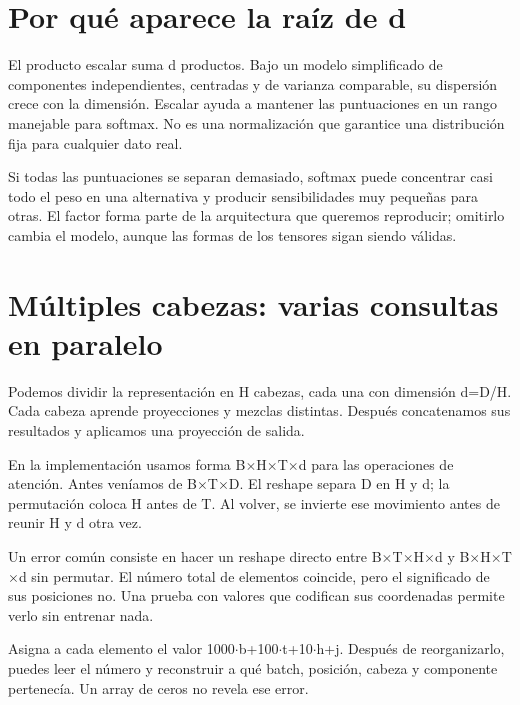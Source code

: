 \documentclass[12pt,a4paper,oneside]{report}
\begin{document}
\section{Por qué aparece la raíz de d}
El producto escalar suma d productos. Bajo un modelo simplificado de componentes independientes, centradas y de varianza comparable, su dispersión crece con la dimensión. Escalar ayuda a mantener las puntuaciones en un rango manejable para softmax. No es una normalización que garantice una distribución fija para cualquier dato real.

Si todas las puntuaciones se separan demasiado, softmax puede concentrar casi todo el peso en una alternativa y producir sensibilidades muy pequeñas para otras. El factor forma parte de la arquitectura que queremos reproducir; omitirlo cambia el modelo, aunque las formas de los tensores sigan siendo válidas.

\section{Múltiples cabezas: varias consultas en paralelo}
Podemos dividir la representación en H cabezas, cada una con dimensión d=D/H. Cada cabeza aprende proyecciones y mezclas distintas. Después concatenamos sus resultados y aplicamos una proyección de salida.

En la implementación usamos forma B\ensuremath{\times}H\ensuremath{\times}T\ensuremath{\times}d para las operaciones de atención. Antes veníamos de B\ensuremath{\times}T\ensuremath{\times}D. El reshape separa D en H y d; la permutación coloca H antes de T. Al volver, se invierte ese movimiento antes de reunir H y d otra vez.

Un error común consiste en hacer un reshape directo entre B\ensuremath{\times}T\ensuremath{\times}H\ensuremath{\times}d y B\ensuremath{\times}H\ensuremath{\times}T\ensuremath{\times}d sin permutar. El número total de elementos coincide, pero el significado de sus posiciones no. Una prueba con valores que codifican sus coordenadas permite verlo sin entrenar nada.

\begin{ejemplo}
Asigna a cada elemento el valor 1000\ensuremath{\cdot}b+100\ensuremath{\cdot}t+10\ensuremath{\cdot}h+j. Después de reorganizarlo, puedes leer el número y reconstruir a qué batch, posición, cabeza y componente pertenecía. Un array de ceros no revela ese error.

\end{ejemplo}
\end{document}
